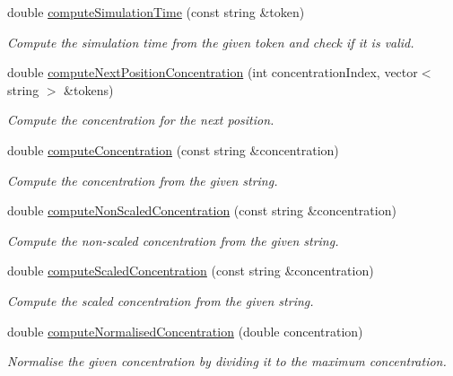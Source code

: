 \begin{DoxyCompactItemize}
double \hyperlink{classmultiscale_1_1video_1_1RectangularCsvToInputFilesConverter_aac755ecce42a0b8772de0716ff310e2b}{compute\-Simulation\-Time} (const string \&token)
\begin{DoxyCompactList}\small\item\em Compute the simulation time from the given token and check if it is valid. \end{DoxyCompactList}\item 
double \hyperlink{classmultiscale_1_1video_1_1RectangularCsvToInputFilesConverter_a0e0c0245ace5606623e8912b1458d3d4}{compute\-Next\-Position\-Concentration} (int concentration\-Index, vector$<$ string $>$ \&tokens)
\begin{DoxyCompactList}\small\item\em Compute the concentration for the next position. \end{DoxyCompactList}\item 
double \hyperlink{classmultiscale_1_1video_1_1RectangularCsvToInputFilesConverter_ab6fae5f617920d8f09cfab347b6b4e54}{compute\-Concentration} (const string \&concentration)
\begin{DoxyCompactList}\small\item\em Compute the concentration from the given string. \end{DoxyCompactList}\item 
double \hyperlink{classmultiscale_1_1video_1_1RectangularCsvToInputFilesConverter_a13f67ac3ecd8f02322ee04befe4935e8}{compute\-Non\-Scaled\-Concentration} (const string \&concentration)
\begin{DoxyCompactList}\small\item\em Compute the non-\/scaled concentration from the given string. \end{DoxyCompactList}\item 
double \hyperlink{classmultiscale_1_1video_1_1RectangularCsvToInputFilesConverter_a34a7ab9fbff04a3c254d5117b3268393}{compute\-Scaled\-Concentration} (const string \&concentration)
\begin{DoxyCompactList}\small\item\em Compute the scaled concentration from the given string. \end{DoxyCompactList}\item 
double \hyperlink{classmultiscale_1_1video_1_1RectangularCsvToInputFilesConverter_a06e8db122fd188559d619108127fc318}{compute\-Normalised\-Concentration} (double concentration)
\begin{DoxyCompactList}\small\item\em Normalise the given concentration by dividing it to the maximum concentration. \end{DoxyCompactList}\item 

\end{DoxyCompactItemize}
